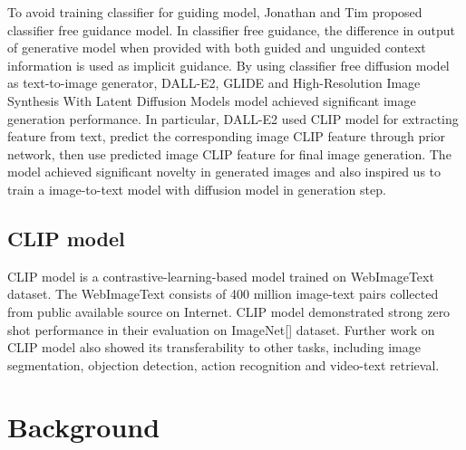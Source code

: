 \documentclass{article}
\begin{document}
To avoid training classifier for guiding model, Jonathan and Tim \cite{classifier-free} proposed classifier free guidance model. In classifier free guidance, the difference in output of generative model when provided with both guided and unguided context information is used as implicit guidance. By using classifier free diffusion model as text-to-image generator, DALL-E2\cite{dalle2}, GLIDE\cite{glide} and High-Resolution Image Synthesis With Latent Diffusion Models\cite{high-resolution-image-synthesis} model achieved significant image generation performance. In particular, DALL-E2 used CLIP model for extracting feature from text, predict the corresponding image CLIP feature through prior network, then use predicted image CLIP feature for final image generation. The model achieved significant novelty in generated images and also inspired us to train a image-to-text model with diffusion model in generation step.

\subsection{CLIP model}
CLIP model is a contrastive-learning-based model trained on WebImageText dataset. The WebImageText consists of 400 million image-text pairs collected from public available source on Internet. CLIP model demonstrated strong zero shot performance in their evaluation on ImageNet[] dataset. Further work on CLIP model also showed its transferability to other tasks, including image segmentation\cite{lseg, groupvit}, objection detection\cite{vild, glip}, action recognition\cite{clip4clip} and video-text retrieval\cite{actionclip}. 

\section{Background}
\end{document}
